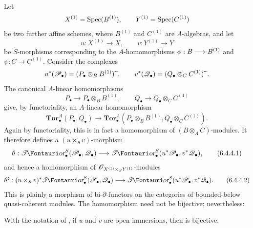 \begin{env}[6.4.4]
\label{III.6.4.4}
Let
\[
  X^{(1)}=\operatorname{Spec}(B^{(1)}),
  \qquad
  Y^{(1)}=\operatorname{Spec}(C^{(1)})
\]
be two further affine schemes, where $B^{(1)}$ and $C^{(1)}$ are
$A$-algebras, and let
\[
  u:X^{(1)}\longrightarrow X,
  \qquad
  v:Y^{(1)}\longrightarrow Y
\]
be $S$-morphisms corresponding to the $A$-homomorphisms
$\phi:B\longrightarrow B^{(1)}$ and
$\psi:C\longrightarrow C^{(1)}$.  Consider the complexes
\[
  u^*(\mathscr{P}_\bullet)
  =
  (P_\bullet\otimes_BB^{(1)}){\,\widetilde{\,}\,},
  \qquad
  v^*(\mathscr{Q}_\bullet)
  =
  (Q_\bullet\otimes_CC^{(1)}){\,\widetilde{\,}\,}.
\]
The canonical $A$-linear homomorphisms
\[
  P_\bullet\longrightarrow P_\bullet\otimes_BB^{(1)},
  \qquad
  Q_\bullet\longrightarrow Q_\bullet\otimes_CC^{(1)}
\]
give, by functoriality, an $A$-linear homomorphism
\[
  \mathbf{Tor}_\bullet^A(P_\bullet,Q_\bullet)
  \longrightarrow
  \mathbf{Tor}_\bullet^A
  (P_\bullet\otimes_BB^{(1)},
   Q_\bullet\otimes_CC^{(1)}).
\]
Again by functoriality, this is in fact a homomorphism of
$(B\otimes_AC)$-modules.  It therefore defines a
$(u\times_Sv)$-morphism
\[
  \theta:
  \shTor_\bullet^S(\sh P_\bullet,\sh Q_\bullet)
  \longrightarrow
  \shTor_\bullet^S(u^*\sh P_\bullet,v^*\sh Q_\bullet),
  \tag{6.4.4.1}\label{III.6.4.4.1}
\]
and hence a homomorphism of
$\mathscr{O}_{X^{(1)}\times_SY^{(1)}}$-modules
\[
  \theta^\sharp:
  (u\times_Sv)^*
  \shTor_\bullet^S(\sh P_\bullet,\sh Q_\bullet)
  \longrightarrow
  \shTor_\bullet^S(u^*\sh P_\bullet,v^*\sh Q_\bullet).
  \tag{6.4.4.2}\label{III.6.4.4.2}
\]
This is plainly a morphism of bi-$\partial$-functors on the
categories of bounded-below quasi-coherent modules.  The
homomorphism  need not be bijective; nevertheless:
\end{env}

\begin{lemma}[6.4.5]
\label{III.6.4.5}
With the notation of , if $u$ and $v$ are open
immersions, then  is bijective.
\end{lemma}

